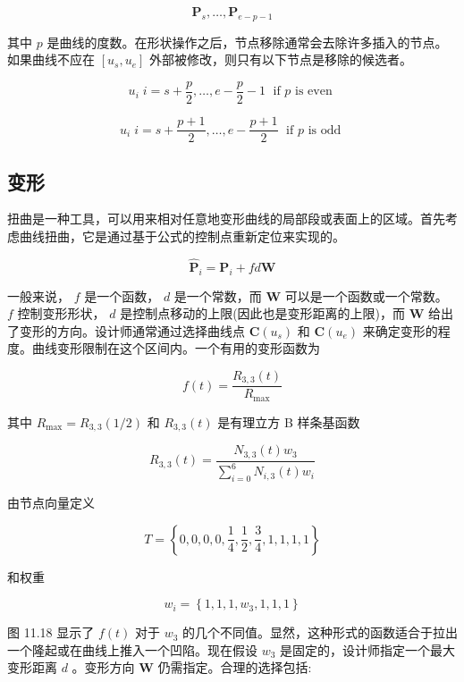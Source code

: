 \documentclass[../main.tex]{subfiles}
\begin{document}
\[
{\mathbf{P}}_{s},\ldots ,{\mathbf{P}}_{e - p - 1} \tag{11.40}
\]

其中 \(p\) 是曲线的度数。在形状操作之后，节点移除通常会去除许多插入的节点。如果曲线不应在 \(\left\lbrack  {{u}_{s},{u}_{e}}\right\rbrack\) 外部被修改，则只有以下节点是移除的候选者。

\[
{u}_{i}\;i = s + \frac{p}{2},\ldots ,e - \frac{p}{2} - 1\;\text{ if }p\text{ is even }
\]

\[
{u}_{i}\;i = s + \frac{p + 1}{2},\ldots ,e - \frac{p + 1}{2}\;\text{ if }p\text{ is odd } \tag{11.41}
\]



\subsection{变形}

扭曲是一种工具，可以用来相对任意地变形曲线的局部段或表面上的区域。首先考虑曲线扭曲，它是通过基于公式的控制点重新定位来实现的。

\[
{\widehat{\mathbf{P}}}_{i} = {\mathbf{P}}_{i} + {fd}\mathbf{W} \tag{11.42}
\]

一般来说， \(f\) 是一个函数， \(d\) 是一个常数，而 \(\mathbf{W}\) 可以是一个函数或一个常数。 \(f\) 控制变形形状， \(d\) 是控制点移动的上限(因此也是变形距离的上限)，而 \(\mathbf{W}\) 给出了变形的方向。设计师通常通过选择曲线点 \(\mathbf{C}\left( {u}_{s}\right)\) 和 \(\mathbf{C}\left( {u}_{e}\right)\) 来确定变形的程度。曲线变形限制在这个区间内。一个有用的变形函数为

\[
f\left( t\right)  = \frac{{R}_{3,3}\left( t\right) }{{R}_{\max }} \tag{11.43}
\]

其中 \({R}_{\max } = {R}_{3,3}\left( {1/2}\right)\) 和 \({R}_{3,3}\left( t\right)\) 是有理立方 B 样条基函数

\[
{R}_{3,3}\left( t\right)  = \frac{{N}_{3,3}\left( t\right) {w}_{3}}{\mathop{\sum }\limits_{{i = 0}}^{6}{N}_{i,3}\left( t\right) {w}_{i}} \tag{11.44}
\]

由节点向量定义

\[
T = \left\{  {0,0,0,0,\frac{1}{4},\frac{1}{2},\frac{3}{4},1,1,1,1}\right\}   \tag{11.45}
\]

和权重

\[
{w}_{i} = \left\{  {1,1,1,{w}_{3},1,1,1}\right\}
\]

图 11.18 显示了 \(f\left( t\right)\) 对于 \({w}_{3}\) 的几个不同值。显然，这种形式的函数适合于拉出一个隆起或在曲线上推入一个凹陷。现在假设 \({w}_{3}\) 是固定的，设计师指定一个最大变形距离 \(d\) 。变形方向 \(\mathbf{W}\) 仍需指定。合理的选择包括:
\end{document}

